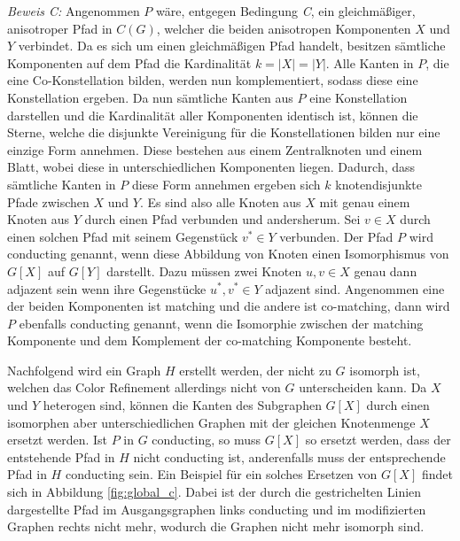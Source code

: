 \emph{Beweis C:} Angenommen $P$ wäre, entgegen Bedingung \emph{C}, ein gleichmäßiger, anisotroper Pfad in $C(G)$, welcher die beiden anisotropen Komponenten $X$ und $Y$ verbindet.
Da es sich um einen gleichmäßigen Pfad handelt, besitzen sämtliche Komponenten auf dem Pfad die Kardinalität $k=|X|=|Y|$.
Alle Kanten in $P$, die eine Co-Konstellation bilden, werden nun komplementiert, sodass diese eine Konstellation ergeben.
Da nun sämtliche Kanten aus $P$ eine Konstellation darstellen und die Kardinalität aller Komponenten identisch ist, können die Sterne, welche die disjunkte Vereinigung für die Konstellationen bilden nur eine einzige Form annehmen.
Diese bestehen aus einem Zentralknoten und einem Blatt, wobei diese in unterschiedlichen Komponenten liegen.
Dadurch, dass sämtliche Kanten in $P$ diese Form annehmen ergeben sich $k$ knotendisjunkte Pfade zwischen $X$ und $Y$.
Es sind also alle Knoten aus $X$ mit genau einem Knoten aus $Y$ durch einen Pfad verbunden und andersherum.
Sei $v\in X$ durch einen solchen Pfad mit seinem Gegenstück $v^*\in Y$ verbunden.
Der Pfad $P$ wird conducting genannt, wenn diese Abbildung von Knoten einen Isomorphismus von $G[X]$ auf $G[Y]$ darstellt.
Dazu müssen zwei Knoten $u,v\in X$ genau dann adjazent sein wenn ihre Gegenstücke $u^*,v^*\in Y$ adjazent sind.
Angenommen eine der beiden Komponenten ist matching und die andere ist co-matching, dann wird $P$ ebenfalls conducting genannt, wenn die Isomorphie zwischen der matching Komponente und dem Komplement der co-matching Komponente besteht.

Nachfolgend wird ein Graph $H$ erstellt werden, der nicht zu $G$ isomorph ist, welchen das Color Refinement allerdings nicht von $G$ unterscheiden kann.
Da $X$ und $Y$ heterogen sind, können die Kanten des Subgraphen $G[X]$ durch einen isomorphen aber unterschiedlichen Graphen mit der gleichen Knotenmenge $X$ ersetzt werden.
Ist $P$ in $G$ conducting, so muss $G[X]$ so ersetzt werden, dass der entstehende Pfad in $H$ nicht conducting ist, anderenfalls muss der entsprechende Pfad in $H$ conducting sein.
Ein Beispiel für ein solches Ersetzen von $G[X]$ findet sich in Abbildung \ref{fig:global_c}.
Dabei ist der durch die gestrichelten Linien dargestellte Pfad im Ausgangsgraphen links conducting und im modifizierten Graphen rechts nicht mehr, wodurch die Graphen nicht mehr isomorph sind.

